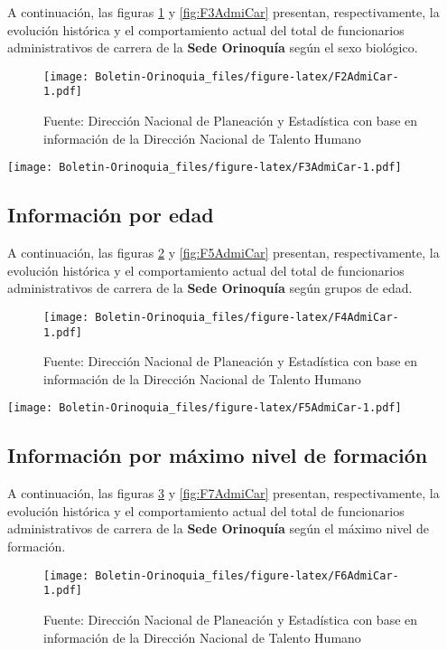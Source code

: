 \documentclass[
]{book}
\begin{document}
A continuación, las figuras \ref{fig:F2AdmiCar} y \ref{fig:F3AdmiCar} presentan, respectivamente, la evolución histórica y el comportamiento actual del total de funcionarios administrativos de carrera de la \textbf{Sede Orinoquía} según el sexo biológico.

\begin{figure}
\centering
\texttt{[image: Boletin-Orinoquia\_files/figure-latex/F2AdmiCar-1.pdf]}
\caption{\label{fig:F2AdmiCar}Fuente: Dirección Nacional de Planeación y Estadística con base en información de la Dirección Nacional de Talento Humano}
\end{figure}

\texttt{[image: Boletin-Orinoquia\_files/figure-latex/F3AdmiCar-1.pdf]}

\hypertarget{informaciuxf3n-por-edad-7}{%
\subsection{Información por edad}\label{informaciuxf3n-por-edad-7}}

A continuación, las figuras \ref{fig:F4AdmiCar} y \ref{fig:F5AdmiCar} presentan, respectivamente, la evolución histórica y el comportamiento actual del total de funcionarios administrativos de carrera de la \textbf{Sede Orinoquía} según grupos de edad.

\begin{figure}
\centering
\texttt{[image: Boletin-Orinoquia\_files/figure-latex/F4AdmiCar-1.pdf]}
\caption{\label{fig:F4AdmiCar}Fuente: Dirección Nacional de Planeación y Estadística con base en información de la Dirección Nacional de Talento Humano}
\end{figure}

\texttt{[image: Boletin-Orinoquia\_files/figure-latex/F5AdmiCar-1.pdf]}

\hypertarget{informaciuxf3n-por-muxe1ximo-nivel-de-formaciuxf3n-1}{%
\subsection{Información por máximo nivel de formación}\label{informaciuxf3n-por-muxe1ximo-nivel-de-formaciuxf3n-1}}

A continuación, las figuras \ref{fig:F6AdmiCar} y \ref{fig:F7AdmiCar} presentan, respectivamente, la evolución histórica y el comportamiento actual del total de funcionarios administrativos de carrera de la \textbf{Sede Orinoquía} según el máximo nivel de formación.

\begin{figure}
\centering
\texttt{[image: Boletin-Orinoquia\_files/figure-latex/F6AdmiCar-1.pdf]}
\caption{\label{fig:F6AdmiCar}Fuente: Dirección Nacional de Planeación y Estadística con base en información de la Dirección Nacional de Talento Humano}
\end{figure}
\end{document}
